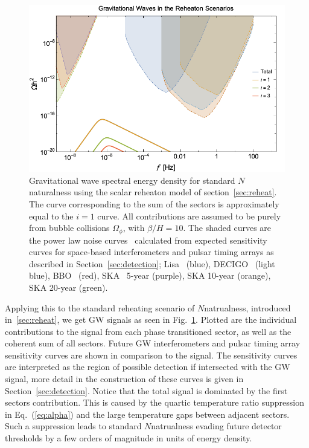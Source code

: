 \documentclass[nofootinbib,twocolumn,preprintnumbers]{revtex4-1}
\begin{document}
\begin{figure}[h!]
\centering
\includegraphics[scale=.3]{Nnatral.png} 
\caption{ Gravitational wave spectral energy density for standard $N$naturalness using the scalar reheaton model of section~\ref{sec:reheat}. The curve corresponding to the sum of the sectors is approximately equal to the $i=1$ curve. All contributions are assumed to be purely from bubble collisions $\Omega_{\phi}$, with $\beta/H  = 10$.  The shaded curves are the power law noise curves~\cite{PhysRevD.88.124032} calculated from expected sensitivity curves for space-based interferometers and pulsar timing arrays as described in Section~\ref{sec:detection}; Lisa~\citep{Audley:2017drz} (blue), DECIGO~\citep{10.1093/ptep/pty078} (light blue), BBO~\citep{PhysRevD.72.083005} (red), SKA~\cite{Janssen:2014dka} 5-year (purple), SKA 10-year (orange), SKA 20-year (green). }
\label{fig::Nnatural}
\end{figure}
Applying this to the standard reheating scenario of $N$natrualness, introduced in~\ref{sec:reheat}, we get GW signals as seen in Fig.~\ref{fig::Nnatural}. Plotted are the individual contributions to the signal from each phase transitioned sector, as well as the coherent sum of all sectors. Future GW interferometers and pulsar timing array sensitivity curves are shown in comparison to the signal. The sensitivity curves are interpreted as the region of possible detection if intersected with the GW signal, more detail in the construction of these curves is given in Section~\ref{sec:detection}. Notice that the total signal is dominated by the first sectors contribution. This is caused by the quartic temperature ratio suppression in Eq.~(\ref{eq:alpha}) and the large temperature gaps between adjacent sectors. Such a suppression leads to standard $N$natrualness evading future detector thresholds by a few orders of magnitude in units of energy density. 
\end{document}
